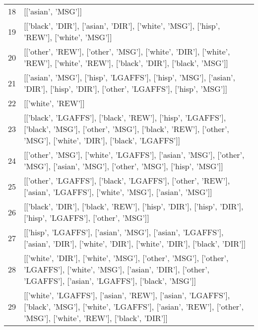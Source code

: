 \begin{tabular}{rl}
18 & [['asian', 'MSG']] \\
19 & [['black', 'DIR'], ['asian', 'DIR'], ['white', 'MSG'], ['hisp', 'REW'], ['white', 'MSG']] \\
20 & [['other', 'REW'], ['other', 'MSG'], ['white', 'DIR'], ['white', 'REW'], ['white', 'REW'], ['black', 'DIR'], ['black', 'MSG']] \\
21 & [['asian', 'MSG'], ['hisp', 'LGAFFS'], ['hisp', 'MSG'], ['asian', 'DIR'], ['hisp', 'DIR'], ['other', 'LGAFFS'], ['hisp', 'MSG']] \\
22 & [['white', 'REW']] \\
23 & [['black', 'LGAFFS'], ['black', 'REW'], ['hisp', 'LGAFFS'], ['black', 'MSG'], ['other', 'MSG'], ['black', 'REW'], ['other', 'MSG'], ['white', 'DIR'], ['black', 'LGAFFS']] \\
24 & [['other', 'MSG'], ['white', 'LGAFFS'], ['asian', 'MSG'], ['other', 'MSG'], ['asian', 'MSG'], ['other', 'MSG'], ['hisp', 'MSG']] \\
25 & [['other', 'LGAFFS'], ['black', 'LGAFFS'], ['other', 'REW'], ['asian', 'LGAFFS'], ['white', 'MSG'], ['asian', 'MSG']] \\
26 & [['black', 'DIR'], ['black', 'REW'], ['hisp', 'DIR'], ['hisp', 'DIR'], ['hisp', 'LGAFFS'], ['other', 'MSG']] \\
27 & [['hisp', 'LGAFFS'], ['asian', 'MSG'], ['asian', 'LGAFFS'], ['asian', 'DIR'], ['white', 'DIR'], ['white', 'DIR'], ['black', 'DIR']] \\
28 & [['white', 'DIR'], ['white', 'MSG'], ['other', 'MSG'], ['other', 'LGAFFS'], ['white', 'MSG'], ['asian', 'DIR'], ['other', 'LGAFFS'], ['asian', 'LGAFFS'], ['black', 'MSG']] \\
29 & [['white', 'LGAFFS'], ['asian', 'REW'], ['asian', 'LGAFFS'], ['black', 'MSG'], ['white', 'LGAFFS'], ['asian', 'REW'], ['other', 'MSG'], ['white', 'REW'], ['black', 'DIR']] \\
\bottomrule
\end{tabular}
